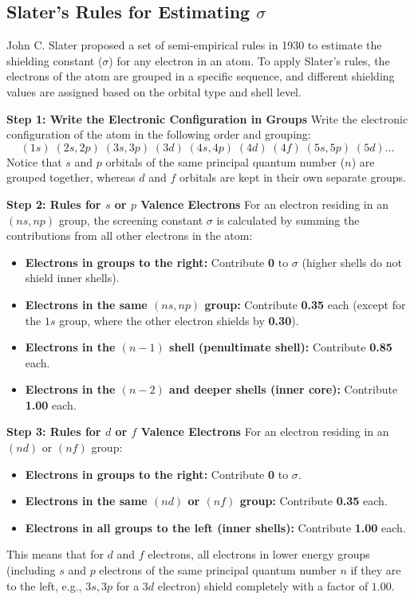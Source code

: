 \documentclass[12pt,a4paper]{article}
\begin{document}
\subsection{Slater's Rules for Estimating \texorpdfstring{$\sigma$}{sigma}}
John C. Slater proposed a set of semi-empirical rules in 1930 to estimate the shielding constant ($\sigma$) for any electron in an atom. To apply Slater's rules, the electrons of the atom are grouped in a specific sequence, and different shielding values are assigned based on the orbital type and shell level.

\textbf{Step 1: Write the Electronic Configuration in Groups}
Write the electronic configuration of the atom in the following order and grouping:
\[ (1s) \; (2s, 2p) \; (3s, 3p) \; (3d) \; (4s, 4p) \; (4d) \; (4f) \; (5s, 5p) \; (5d) \dots \]
Notice that $s$ and $p$ orbitals of the same principal quantum number ($n$) are grouped together, whereas $d$ and $f$ orbitals are kept in their own separate groups.

\textbf{Step 2: Rules for $s$ or $p$ Valence Electrons}
For an electron residing in an $(ns, np)$ group, the screening constant $\sigma$ is calculated by summing the contributions from all other electrons in the atom:
\begin{itemize}[leftmargin=*, itemsep=2pt]
  \item \textbf{Electrons in groups to the right:} Contribute \textbf{0} to $\sigma$ (higher shells do not shield inner shells).
  \item \textbf{Electrons in the same $(ns, np)$ group:} Contribute \textbf{0.35} each (except for the $1s$ group, where the other electron shields by \textbf{0.30}).
  \item \textbf{Electrons in the $(n-1)$ shell (penultimate shell):} Contribute \textbf{0.85} each.
  \item \textbf{Electrons in the $(n-2)$ and deeper shells (inner core):} Contribute \textbf{1.00} each.
\end{itemize}

\textbf{Step 3: Rules for $d$ or $f$ Valence Electrons}
For an electron residing in an $(nd)$ or $(nf)$ group:
\begin{itemize}[leftmargin=*, itemsep=2pt]
  \item \textbf{Electrons in groups to the right:} Contribute \textbf{0} to $\sigma$.
  \item \textbf{Electrons in the same $(nd)$ or $(nf)$ group:} Contribute \textbf{0.35} each.
  \item \textbf{Electrons in all groups to the left (inner shells):} Contribute \textbf{1.00} each.
\end{itemize}
This means that for $d$ and $f$ electrons, all electrons in lower energy groups (including $s$ and $p$ electrons of the same principal quantum number $n$ if they are to the left, e.g., $3s, 3p$ for a $3d$ electron) shield completely with a factor of $1.00$.
\end{document}
